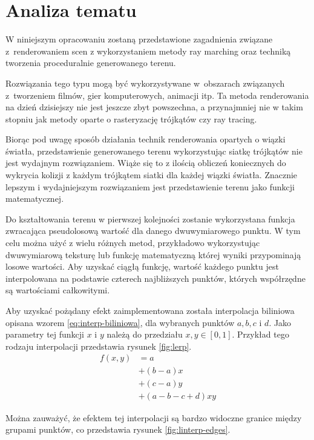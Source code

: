 \chapter{Analiza tematu}

W niniejszym opracowaniu zostaną przedstawione zagadnienia związane z~renderowaniem scen z wykorzystaniem metody ray marching oraz techniką tworzenia proceduralnie generowanego terenu.

Rozwiązania tego typu mogą być wykorzystywane w~obszarach związanych z~tworzeniem filmów, gier komputerowych, animacji itp. Ta metoda renderowania na dzień dzisiejszy nie jest jeszcze zbyt powszechna, a przynajmniej nie w takim stopniu jak metody oparte o rasteryzację trójkątów czy ray tracing.

Biorąc pod uwagę sposób działania technik renderowania opartych o wiązki światła, przedstawienie generowanego terenu wykorzystując siatkę trójkątów nie jest wydajnym rozwiązaniem. Wiąże się to z ilością obliczeń koniecznych do wykrycia kolizji z każdym trójkątem siatki dla każdej wiązki światła. Znacznie lepszym  i wydajniejszym rozwiązaniem jest przedstawienie terenu jako funkcji matematycznej.

Do kształtowania terenu w pierwszej kolejności zostanie wykorzystana funkcja zwracająca pseudolosową wartość dla danego dwuwymiarowego punktu\cite{bib:iqterrain}.
W tym celu można użyć z wielu różnych metod, przykładowo wykorzystując dwuwymiarową teksturę
lub funkcję matematyczną której wyniki przypominają losowe wartości. Aby uzyskać ciągłą funkcję, wartość każdego punktu jest interpolowana na podstawie czterech najbliższych punktów, których współrzędne są wartościami całkowitymi.

Aby uzyskać pożądany efekt zaimplementowana została interpolacja biliniowa opisana wzorem \ref{eq:interp-biliniowa}, dla wybranych punktów $a, b, c$ i $d$. Jako parametry tej funkcji $x$ i $y$ należą do przedziału $x, y \in [0, 1]$. Przykład tego rodzaju interpolacji przedstawia rysunek \ref{fig:lerp}.
\begin{equation}[H]
\label{eq:interp-biliniowa}
  \begin{split}
    f(x, y) & = a \\
       & + (b - a) x \\
       & + (c - a) y \\
       & + (a - b - c + d) x y
    \end{split}
\end{equation}

Można zauważyć, że efektem tej interpolacji są bardzo widoczne granice między grupami punktów, co przedstawia rysunek \ref{fig:linterp-edges}.

